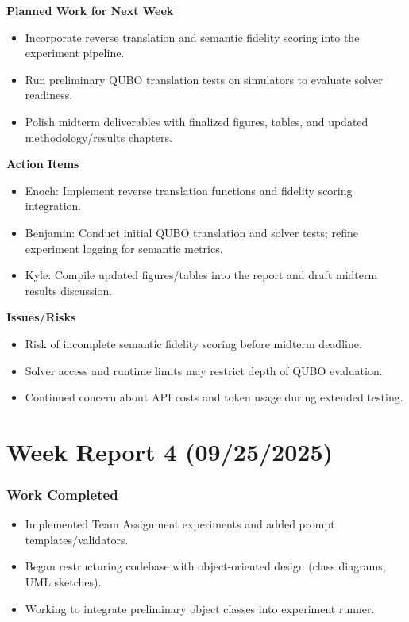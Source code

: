 \textbf{Planned Work for Next Week}
\begin{itemize}
    \item Incorporate reverse translation and semantic fidelity scoring into the experiment pipeline.
    \item Run preliminary QUBO translation tests on simulators to evaluate solver readiness.
    \item Polish midterm deliverables with finalized figures, tables, and updated methodology/results chapters.
\end{itemize}

\textbf{Action Items}
\begin{itemize}
    \item Enoch: Implement reverse translation functions and fidelity scoring integration.
    \item Benjamin: Conduct initial QUBO translation and solver tests; refine experiment logging for semantic metrics.
    \item Kyle: Compile updated figures/tables into the report and draft midterm results discussion.
\end{itemize}

\textbf{Issues/Risks}
\begin{itemize}
    \item Risk of incomplete semantic fidelity scoring before midterm deadline.
    \item Solver access and runtime limits may restrict depth of QUBO evaluation.
    \item Continued concern about API costs and token usage during extended testing.
\end{itemize}

\section{Week Report 4 (09/25/2025)}

\subsubsection{Work Completed}

\begin{itemize}
  \item Implemented Team Assignment experiments and added prompt templates/validators. 
  \item Began restructuring codebase with object-oriented design (class diagrams, UML sketches). 
  \item Working to integrate preliminary object classes into experiment runner.  
\end{itemize}

